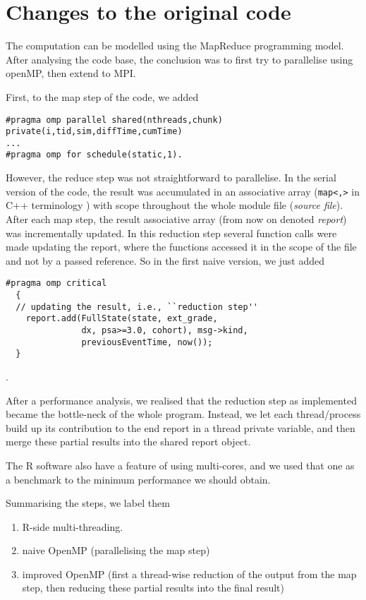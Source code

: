 
\section{Changes to the original code}
The computation can be modelled using the MapReduce programming model. After
analysing the code base, the conclusion was to first try to
parallelise using openMP, then extend to MPI.

First, to the map step of the code, we added
\begin{lstlisting}
#pragma omp parallel shared(nthreads,chunk) private(i,tid,sim,diffTime,cumTime)
...
#pragma omp for schedule(static,1).
\end{lstlisting}
However, the reduce step was not straightforward to parallelise. In
the serial version of the code, the result was accumulated in an
associative array (\texttt{map<,>} in C++ terminology ) with scope
throughout the whole module file (\emph{source file}). After each map
step, the result associative array (from now on denoted \emph{report})
was incrementally updated. In this reduction step several function
calls were made updating the report, where the functions
accessed it in the scope of the file and not by a passed reference. So
in the first naive version, we just added \lstset{language=C++}
\begin{lstlisting}
#pragma omp critical
  {
  // updating the result, i.e., ``reduction step''
    report.add(FullState(state, ext_grade,
               dx, psa>=3.0, cohort), msg->kind,
               previousEventTime, now());
  }
\end{lstlisting}.

After a performance analysis, we realised that the reduction step as
implemented became the bottle-neck of the whole program. Instead, we
let each thread/process build up its contribution to the end report in
a thread private variable, and then merge these partial results into the
shared report object.

The R software also have a feature of using multi-cores, and we used
that one as a benchmark to the minimum performance we should obtain.

Summarising the steps, we label them
\begin{enumerate}
\item R-side multi-threading.
\item naive OpenMP (parallelising the map step)
\item improved OpenMP (first a thread-wise reduction of the output
  from the map step, then
  reducing these partial results into the final result)
\end{enumerate}



